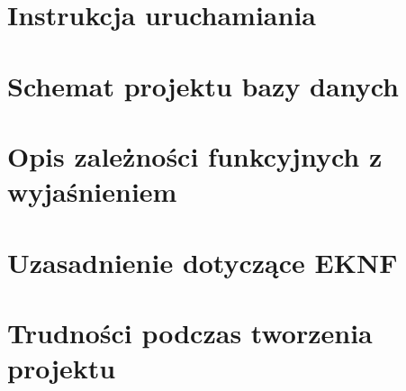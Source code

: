 \documentclass[12pt,a4paper]{article}
\begin{document}
\section{Instrukcja uruchamiania}

\section{Schemat projektu bazy danych}

\section{Opis zależności funkcyjnych z wyjaśnieniem}

\section{Uzasadnienie dotyczące EKNF}

\section{Trudności podczas tworzenia projektu}
\end{document}
